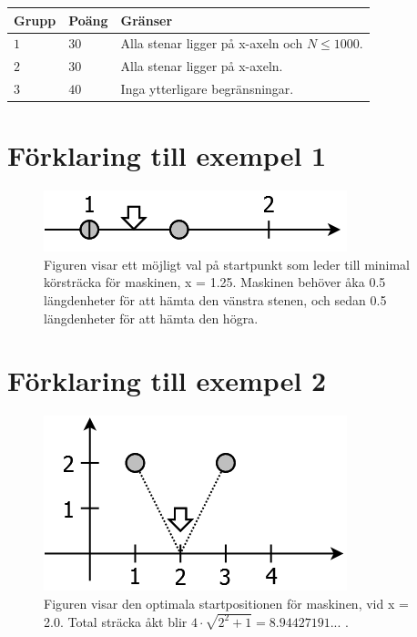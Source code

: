\noindent
\begin{tabular}{| l | l | p{12cm} |}
  \hline
  \textbf{Grupp} & \textbf{Poäng} & \textbf{Gränser} \\ \hline
  $1$    & $30$       & Alla stenar ligger på x-axeln och $N \leq 1000$. \\ \hline
  $2$    & $30$       & Alla stenar ligger på x-axeln. \\ \hline
  $3$    & $40$       & Inga ytterligare begränsningar. \\ \hline
\end{tabular}


\section*{Förklaring till exempel 1}

\begin{figure}[!h]
\begin{center}
\includegraphics[scale=0.4]{stenar1.png}
\end{center}
\caption{Figuren visar ett möjligt val på startpunkt som leder till minimal körsträcka för maskinen, x = 1.25. Maskinen behöver åka 0.5 längdenheter för att hämta den vänstra stenen, och sedan 0.5 längdenheter för att hämta den högra.}
\label{fig1}
\end{figure}

\section*{Förklaring till exempel 2}
\begin{figure}[!h]
\begin{center}
\includegraphics[scale=0.4]{stenar2.png}
\end{center}
\caption{Figuren visar den optimala startpositionen för maskinen, vid x = 2.0. Total sträcka åkt blir $4\cdot\sqrt{2^2 + 1} = 8.94427191...$ .}
\label{fig1}
\end{figure}
